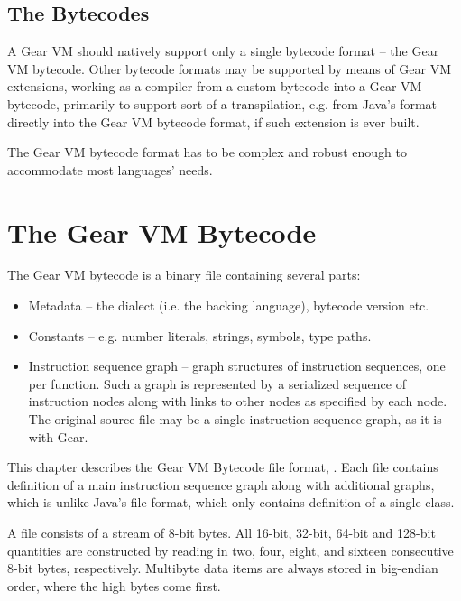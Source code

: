 \section{The Bytecodes}

A Gear VM should natively support only a single bytecode format -- the Gear VM bytecode. Other bytecode formats may be supported by means of Gear VM extensions, working as a compiler from a custom bytecode into a Gear VM bytecode, primarily to support sort of a transpilation, e.g. from Java's  format directly into the Gear VM bytecode format, if such extension is ever built. 

The Gear VM bytecode format has to be complex and robust enough to accommodate most languages' needs. 





\chapter{The Gear VM Bytecode}






The Gear VM bytecode is a binary file containing several parts:

\begin{itemize}
\item Metadata -- the dialect (i.e. the backing language), bytecode version etc.
\item Constants -- e.g. number literals, strings, symbols, type paths. 
\item Instruction sequence graph -- graph structures of instruction sequences, one per function. Such a graph is represented by a serialized sequence of instruction nodes along with links to other nodes as specified by each node. The original source file may be a single instruction sequence graph, as it is with Gear. 
\end{itemize}

This chapter describes the Gear VM Bytecode file format, . Each  file contains definition of a main instruction sequence graph along with additional graphs, which is unlike Java's  file format, which only contains definition of a single class. 

A  file consists of a stream of 8-bit bytes. All 16-bit, 32-bit, 64-bit and 128-bit quantities are constructed by reading in two, four, eight, and sixteen consecutive 8-bit bytes, respectively. Multibyte data items are always stored in big-endian order, where the high bytes come first. 

